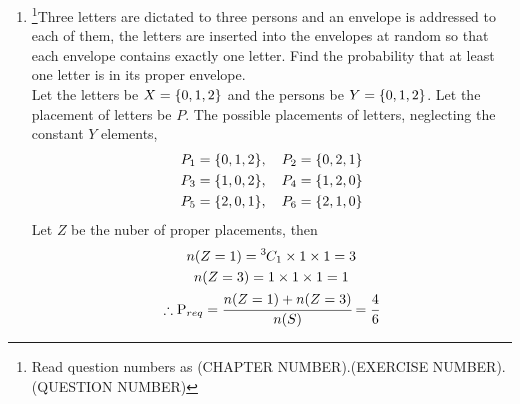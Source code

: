 \documentclass[../assign.tex]{subfiles}
\begin{document}
\begin{enumerate}[label=16.\arabic{enumi}.\arabic{enumii}]%
\setcounter{enumi}{3}
\setcounter{enumii}{6}
\item \footnote{Read question numbers as (CHAPTER NUMBER).(EXERCISE NUMBER).(QUESTION NUMBER)}Three letters are dictated to three persons and an envelope is addressed to each of them, the letters are inserted into the envelopes at random so that each envelope contains exactly one letter. Find the probability that at least one letter is in its proper envelope.\\[1ex]
	\solution
		Let the letters be $X = \left\{0,1,2\right\}$ and the persons be $Y = \left\{0,1,2\right\}$. Let the placement of letters be $P$.
  The possible placements of letters, neglecting the constant $Y$ elements, %
  \begin{align*}
	  P_1 = \left\{0,1,2\right\} &, \quad P_2 = \left\{0,2,1\right\} \\
	  P_3 = \left\{1,0,2\right\} &, \quad P_4 = \left\{1,2,0\right\} \\
	  P_5 = \left\{2,0,1\right\} &, \quad P_6 = \left\{2,1,0\right\} 
  \end{align*}
  Let $Z$ be the nuber of proper placements, then
  \begin{gather}
	  n(Z=1) = \comb{3}{1} \times 1 \times 1 = 3 \\
	  n(Z=3) = 1 \times 1 \times 1 = 1 \\
	  \therefore \text{P}_{req} = \cfrac{n(Z=1)+n(Z=3)}{n(S)} = \cfrac{4}{6} %
  \end{gather}
		
\noindent{}

\end{enumerate}
\end{document}
